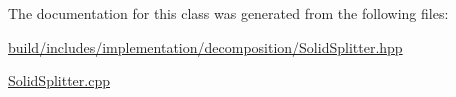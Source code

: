 The documentation for this class was generated from the following files\+:\begin{DoxyCompactItemize}
\item 
\hyperlink{build_2includes_2implementation_2decomposition_2SolidSplitter_8hpp}{build/includes/implementation/decomposition/\+Solid\+Splitter.\+hpp}\item 
\hyperlink{SolidSplitter_8cpp}{Solid\+Splitter.\+cpp}\end{DoxyCompactItemize}
